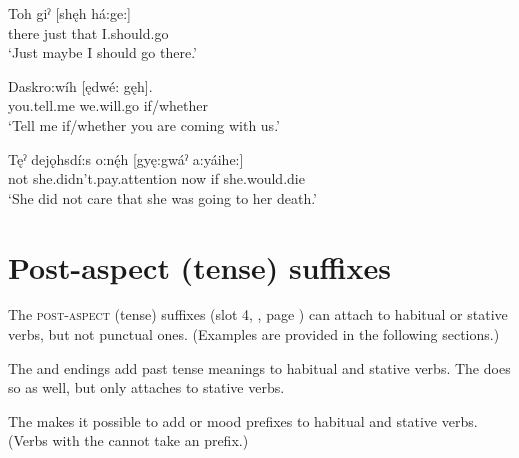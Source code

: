 \ea\label{ex:noaspectex3} 
\ea\label{ex:noaspectex3a} 
\gll Toh giˀ [shęh há:ge:] \\
there just that I.should.go\\
\glt ‘Just maybe I should go there.’  


\ex \label{ex:noaspectex3b}
\gll Daskro:wíh [ędwé: gęh]. \\
you.tell.me we.will.go if/whether \\
\glt ‘Tell me if/whether you are coming with us.’ 



\ex\label{ex:noaspectex3c}
\gll Tęˀ dejǫhsdí:s o:nę́h [gyę:gwáˀ a:yáihe:] \\
not she.didn’t.pay.attention now if she.would.die\\
\glt ‘She did not care that she was going to her death.’ 

\z
\z 


\section{Post-aspect (tense) suffixes} \label{Post-aspect (tense) suffixes}
The \textsc{post-aspect} (tense) suffixes (slot 4, , page \pageref{figtab:1:verbsuffixorder}) can attach to habitual or stative verbs, but not punctual ones. (Examples are provided in the following sections.) 

The  \textsc{\past} and  \textsc{\former} endings add past tense meanings to habitual and stative verbs. The  \textsc{\remote} does so as well, but only attaches to stative verbs.

The  \textsc{\modalizer} makes it possible to add  \textsc{\future} or  \textsc{\indefinite} mood prefixes to habitual and stative verbs. (Verbs with the  \textsc{\modalizer} cannot take an  \textsc{\factual} prefix.)



